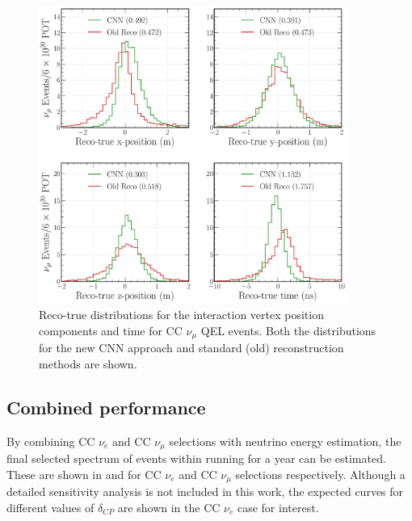 \begin{figure} %
    \includegraphics[width=0.9\textwidth]{diagrams/7-results/final_vertex_numu_res_comparison.pdf}
    \caption[Reco-true distributions for the interaction vertex parameters for CC $\nu_{\mu}$ QEL
        events] {Reco-true distributions for the interaction vertex position components and time
        for CC $\nu_{\mu}$ QEL events. Both the distributions for the new CNN approach and
        standard (old) reconstruction methods are shown.}
    \label{fig:final_vertex_numu_res_comparison}
\end{figure}

\subsection{Combined performance} %
\label{sec:results_eval_combined} %

By combining CC $\nu_{e}$ and CC $\nu_{\mu}$ selections with neutrino energy estimation, the final
selected spectrum of events within \chipsfive running for a year can be estimated. These are shown
in  and 
for CC $\nu_{e}$ and CC $\nu_{\mu}$ selections respectively. Although a detailed \chipsfive
sensitivity analysis is not included in this work, the expected curves for different values of
$\delta_{CP}$ are shown in the CC $\nu_{e}$ case for interest.

